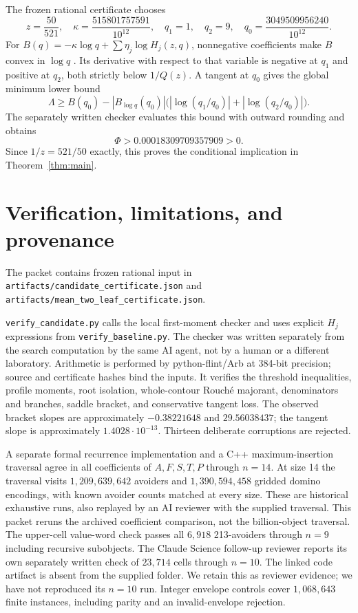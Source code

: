 \documentclass[11pt]{amsart}
\numberwithin{equation}{section}
\theoremstyle{remark}\newtheorem{remark}[theorem]{Remark}
\begin{document}
The frozen rational certificate chooses
\begin{equation}\label{eq:cert}
 z=\frac{50}{521},\quad \kappa=\frac{515801757591}{10^{12}},\quad
 q_1=1,\quad q_2=9,\quad q_0=\frac{3049509956240}{10^{12}}.
\end{equation}
For $B(q)=-\kappa\log q+\sum\eta_j\log H_j(z,q)$, nonnegative coefficients make $B$ convex in $\log q$ \cite[Lemma 4.1]{N3}. Its derivative with respect to that variable is negative at $q_1$ and positive at $q_2$, both strictly below $1/Q(z)$. A tangent at $q_0$ gives the global minimum lower bound
\[
 \Lambda\geq B(q_0)-|B_{\log q}(q_0)|
       \bigl(|\log(q_1/q_0)|+|\log(q_2/q_0)|\bigr).
\]
The separately written checker evaluates this bound with outward rounding and obtains
\begin{equation}\label{eq:Phi}
 \Phi>0.00018309709357909>0.
\end{equation}
Since $1/z=521/50$ exactly, this proves the conditional implication in Theorem~\ref{thm:main}.

\section{Verification, limitations, and provenance}
The packet contains frozen rational input in
\texttt{artifacts/candidate\_certificate.json} and
\texttt{artifacts/mean\_two\_leaf\_certificate.json}.

\texttt{verify\_candidate.py} calls the local first-moment checker and uses explicit $H_j$ expressions from \texttt{verify\_baseline.py}. The checker was written separately from the search computation by the same AI agent, not by a human or a different laboratory. Arithmetic is performed by python-flint/Arb at 384-bit precision; source and certificate hashes bind the inputs. It verifies the threshold inequalities, profile moments, root isolation, whole-contour Rouch\'e majorant, denominators and branches, saddle bracket, and conservative tangent loss. The observed bracket slopes are approximately $-0.38221648$ and $29.56038437$; the tangent slope is approximately $1.4028\cdot10^{-13}$. Thirteen deliberate corruptions are rejected.

A separate formal recurrence implementation and a C++ maximum-insertion traversal agree in all coefficients of $A,F,S,T,P$ through $n=14$. At size 14 the traversal visits $1,209,639,642$ avoiders and $1,390,594,458$ gridded domino encodings, with known avoider counts matched at every size. These are historical exhaustive runs, also replayed by an AI reviewer with the supplied traversal. This packet reruns the archived coefficient comparison, not the billion-object traversal. The upper-cell value-word check passes all $6,918$ 213-avoiders through $n=9$ including recursive subobjects. The Claude Science follow-up reviewer reports its own separately written check of $23,714$ cells through $n=10$. The linked code artifact is absent from the supplied folder. We retain this as reviewer evidence; we have not reproduced its $n=10$ run. Integer envelope controls cover $1,068,643$ finite instances, including parity and an invalid-envelope rejection.
\end{document}

